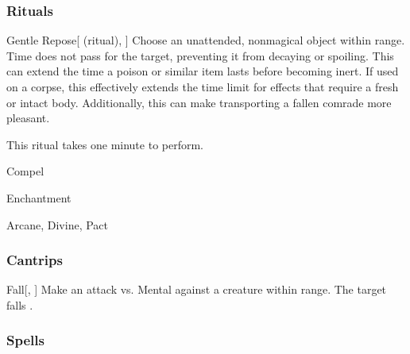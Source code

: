 \subsubsection{Rituals}


\lowercase{\hypertarget{spell:Gentle Repose}{}}\label{spell:Gentle Repose}
\begin{attuneability}[\nth{2}]{\hypertarget{spell:Gentle Repose}{Gentle Repose}}[ (ritual), ]
Choose an unattended, nonmagical object within \rngclose range.
Time does not pass for the target, preventing it from decaying or spoiling.
This can extend the time a poison or similar item lasts before becoming inert.
If used on a corpse, this effectively extends the time limit for effects that require a fresh or intact body.
Additionally, this can make transporting a fallen comrade more pleasant.


This ritual takes one minute to perform.
\end{attuneability}
\vspace{0.25em}


\newpage
\begin{spellsection}{Compel}

\begin{spellheader}
\end{spellheader}


 Enchantment

 Arcane, Divine, Pact

\subsubsection{Cantrips}


\begin{freeability}{Fall}[, ]
Make an attack vs. Mental against a creature within \rngmed range.
\hit The target falls .
\end{freeability}

\end{spellsection}


\subsubsection{Spells}


